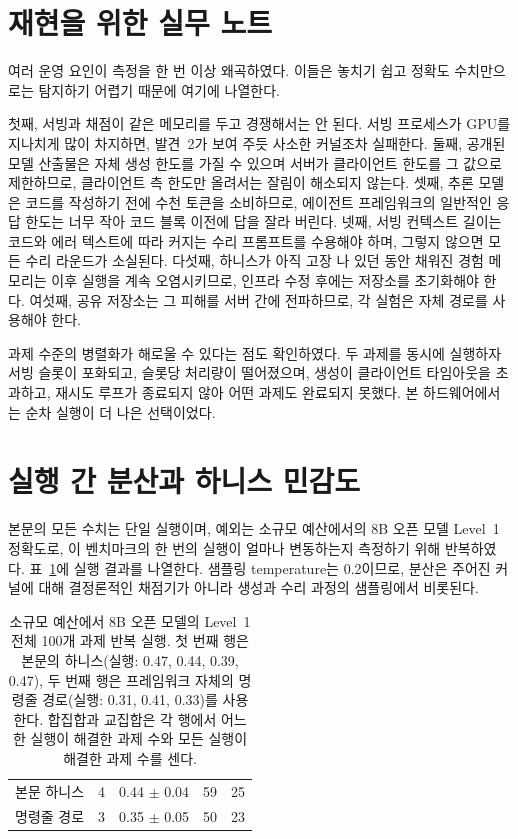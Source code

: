 \section{재현을 위한 실무 노트}\label{sec:notes}

여러 운영 요인이 측정을 한 번 이상 왜곡하였다. 이들은 놓치기 쉽고 정확도 수치만으로는 탐지하기
어렵기 때문에 여기에 나열한다.

첫째, 서빙과 채점이 같은 메모리를 두고 경쟁해서는 안 된다. 서빙 프로세스가 GPU를 지나치게 많이
차지하면, 발견~2가 보여 주듯 사소한 커널조차 실패한다. 둘째, 공개된 모델 산출물은 자체 생성 한도를
가질 수 있으며 서버가 클라이언트 한도를 그 값으로 제한하므로, 클라이언트 측 한도만 올려서는 잘림이
해소되지 않는다. 셋째, 추론 모델은 코드를 작성하기 전에 수천 토큰을 소비하므로, 에이전트 프레임워크의
일반적인 응답 한도는 너무 작아 코드 블록 이전에 답을 잘라 버린다. 넷째, 서빙 컨텍스트 길이는 코드와
에러 텍스트에 따라 커지는 수리 프롬프트를 수용해야 하며, 그렇지 않으면 모든 수리 라운드가 소실된다.
다섯째, 하니스가 아직 고장 나 있던 동안 채워진 경험 메모리는 이후 실행을 계속 오염시키므로, 인프라
수정 후에는 저장소를 초기화해야 한다. 여섯째, 공유 저장소는 그 피해를 서버 간에 전파하므로, 각
실험은 자체 경로를 사용해야 한다.

과제 수준의 병렬화가 해로울 수 있다는 점도 확인하였다. 두 과제를 동시에 실행하자 서빙 슬롯이
포화되고, 슬롯당 처리량이 떨어졌으며, 생성이 클라이언트 타임아웃을 초과하고, 재시도 루프가 종료되지
않아 어떤 과제도 완료되지 못했다. 본 하드웨어에서는 순차 실행이 더 나은 선택이었다.

\section{실행 간 분산과 하니스 민감도}\label{sec:app-variance}

본문의 모든 수치는 단일 실행이며, 예외는 소규모 예산에서의 8B 오픈 모델 Level~1 정확도로, 이
벤치마크의 한 번의 실행이 얼마나 변동하는지 측정하기 위해 반복하였다. 표~\ref{tab:app-variance}에
실행 결과를 나열한다. 샘플링 temperature는 0.2이므로, 분산은 주어진 커널에 대해 결정론적인
채점기가 아니라 생성과 수리 과정의 샘플링에서 비롯된다.

\begin{table}[t]
\centering
\small
\setlength{\tabcolsep}{5pt}
\caption{소규모 예산에서 8B 오픈 모델의 Level~1 전체 100개 과제 반복 실행.
첫 번째 행은 본문의 하니스(실행: 0.47, 0.44, 0.39, 0.47), 두 번째 행은 프레임워크 자체의
명령줄 경로(실행: 0.31, 0.41, 0.33)를 사용한다. 합집합과 교집합은 각 행에서 어느 한 실행이
해결한 과제 수와 모든 실행이 해결한 과제 수를 센다.}
\label{tab:app-variance}
\begin{tabular}{@{}lrrrr@{}}
\toprule
\headrow{경로} & \headrow{실행 수} & \headrow{평균 $\pm$ 표준편차} & \headrow{합집합} & \headrow{교집합} \\
\midrule
본문 하니스   & 4 & 0.44 $\pm$ 0.04 & 59 & 25 \\
명령줄 경로   & 3 & 0.35 $\pm$ 0.05 & 50 & 23 \\
\bottomrule
\end{tabular}
\end{table}

